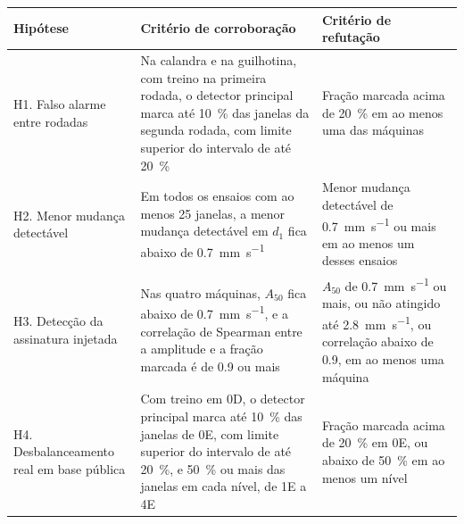 \begin{quadro}[!htb]
\centering\small
\caption{Hipóteses e critérios de corroboração e de refutação}\label{tab:hipoteses}
\begin{tabular}{@{}>{\raggedright\arraybackslash}p{36mm}>{\raggedright\arraybackslash}p{62mm}>{\raggedright\arraybackslash}p{46mm}@{}}
\toprule
Hipótese & Critério de corroboração & Critério de refutação \\
\midrule
H1. Falso alarme entre rodadas & Na calandra e na guilhotina, com treino na primeira rodada, o detector principal marca até \SI{10}{\percent} das janelas da segunda rodada, com limite superior do intervalo de até \SI{20}{\percent} & Fração marcada acima de \SI{20}{\percent} em ao menos uma das máquinas \\
\addlinespace
H2. Menor mudança detectável & Em todos os ensaios com ao menos \num{25} janelas, a menor mudança detectável em $d_1$ fica abaixo de \SI{0,7}{\milli\meter\per\second} & Menor mudança detectável de \SI{0,7}{\milli\meter\per\second} ou mais em ao menos um desses ensaios \\
\addlinespace
H3. Detecção da assinatura injetada & Nas quatro máquinas, $A_{50}$ fica abaixo de \SI{0,7}{\milli\meter\per\second}, e a correlação de Spearman entre a amplitude e a fração marcada é de \num{0,9} ou mais & $A_{50}$ de \SI{0,7}{\milli\meter\per\second} ou mais, ou não atingido até \SI{2,8}{\milli\meter\per\second}, ou correlação abaixo de \num{0,9}, em ao menos uma máquina \\
\addlinespace
H4. Desbalanceamento real em base pública & Com treino em 0D, o detector principal marca até \SI{10}{\percent} das janelas de 0E, com limite superior do intervalo de até \SI{20}{\percent}, e \SI{50}{\percent} ou mais das janelas em cada nível, de 1E a 4E & Fração marcada acima de \SI{20}{\percent} em 0E, ou abaixo de \SI{50}{\percent} em ao menos um nível \\
\bottomrule
\end{tabular}
\end{quadro}

